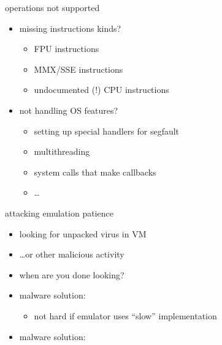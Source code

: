 \begin{frame}{operations not supported}
    \begin{itemize}
    \item missing instructions kinds?
        \begin{itemize}
        \item FPU instructions
        \item MMX/SSE instructions
        \item undocumented (!) CPU instructions
        \end{itemize}
    \item not handling OS features?
        \begin{itemize}
        \item setting up special handlers for segfault
        \item multithreading
        \item system calls that make callbacks
        \item \ldots
        \end{itemize}
    \end{itemize}
\end{frame}

\begin{frame}{attacking emulation patience}
    \begin{itemize}
    \item looking for unpacked virus in VM
    \item \ldots or other malicious activity
    \item when are you done looking?
    \vspace{.5cm}
    \item<2-> malware solution: 
        \begin{itemize}
        \item not hard if emulator uses ``slow'' implementation
        \end{itemize}
    \item<3-> malware solution: 
    \end{itemize}
\end{frame}

